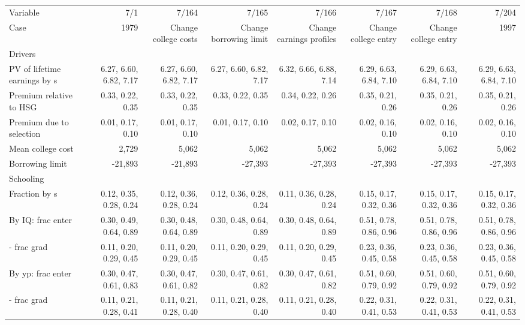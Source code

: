 \begin{tabular}{lrrrrrrr}
\hline
Variable & 7/1  & 7/164  & 7/165  & 7/166  & 7/167  & 7/168  & 7/204  \\ 
Case & 1979  & Change college costs  & Change borrowing limit  & Change earnings profiles  & Change college entry  & Change college entry  & 1997  \\ 
Drivers &   &   &   &   &   &   &   \\ 
PV of lifetime earnings by s & 6.27, 6.60, 6.82, 7.17  & 6.27, 6.60, 6.82, 7.17  & 6.27, 6.60, 6.82, 7.17  & 6.32, 6.66, 6.88, 7.14  & 6.29, 6.63, 6.84, 7.10  & 6.29, 6.63, 6.84, 7.10  & 6.29, 6.63, 6.84, 7.10  \\ 
Premium relative to HSG & 0.33, 0.22, 0.35  & 0.33, 0.22, 0.35  & 0.33, 0.22, 0.35  & 0.34, 0.22, 0.26  & 0.35, 0.21, 0.26  & 0.35, 0.21, 0.26  & 0.35, 0.21, 0.26  \\ 
Premium due to selection & 0.01, 0.17, 0.10  & 0.01, 0.17, 0.10  & 0.01, 0.17, 0.10  & 0.02, 0.17, 0.10  & 0.02, 0.16, 0.10  & 0.02, 0.16, 0.10  & 0.02, 0.16, 0.10  \\ 
Mean college cost & 2,729  & 5,062  & 5,062  & 5,062  & 5,062  & 5,062  & 5,062  \\ 
Borrowing limit & -21,893  & -21,893  & -27,393  & -27,393  & -27,393  & -27,393  & -27,393  \\ 
\hline
Schooling &   &   &   &   &   &   &   \\ 
Fraction by s & 0.12, 0.35, 0.28, 0.24  & 0.12, 0.36, 0.28, 0.24  & 0.12, 0.36, 0.28, 0.24  & 0.11, 0.36, 0.28, 0.24  & 0.15, 0.17, 0.32, 0.36  & 0.15, 0.17, 0.32, 0.36  & 0.15, 0.17, 0.32, 0.36  \\ 
By IQ: frac enter & 0.30, 0.49, 0.64, 0.89  & 0.30, 0.48, 0.64, 0.89  & 0.30, 0.48, 0.64, 0.89  & 0.30, 0.48, 0.64, 0.89  & 0.51, 0.78, 0.86, 0.96  & 0.51, 0.78, 0.86, 0.96  & 0.51, 0.78, 0.86, 0.96  \\ 
- frac grad & 0.11, 0.20, 0.29, 0.45  & 0.11, 0.20, 0.29, 0.45  & 0.11, 0.20, 0.29, 0.45  & 0.11, 0.20, 0.29, 0.45  & 0.23, 0.36, 0.45, 0.58  & 0.23, 0.36, 0.45, 0.58  & 0.23, 0.36, 0.45, 0.58  \\ 
By yp: frac enter & 0.30, 0.47, 0.61, 0.83  & 0.30, 0.47, 0.61, 0.82  & 0.30, 0.47, 0.61, 0.82  & 0.30, 0.47, 0.61, 0.82  & 0.51, 0.60, 0.79, 0.92  & 0.51, 0.60, 0.79, 0.92  & 0.51, 0.60, 0.79, 0.92  \\ 
- frac grad & 0.11, 0.21, 0.28, 0.41  & 0.11, 0.21, 0.28, 0.40  & 0.11, 0.21, 0.28, 0.40  & 0.11, 0.21, 0.28, 0.40  & 0.22, 0.31, 0.41, 0.53  & 0.22, 0.31, 0.41, 0.53  & 0.22, 0.31, 0.41, 0.53  \\ 

\end{tabular}
